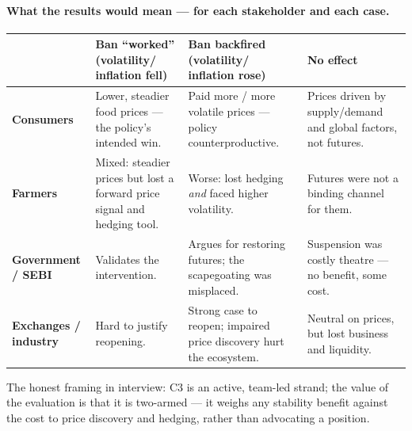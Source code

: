 \documentclass[11pt]{article}
\begin{document}
\paragraph{What the results would mean --- for each stakeholder and each case.}
\begin{center}
\small
\begin{tabular}{@{}p{2.4cm}p{3.5cm}p{3.5cm}p{3.5cm}@{}}
\toprule
 & \textbf{Ban ``worked''} (volatility/ inflation fell) & \textbf{Ban backfired} (volatility/ inflation rose) & \textbf{No effect} \\
\midrule
\textbf{Consumers} & Lower, steadier food prices --- the policy's intended win. & Paid more / more volatile prices --- policy counterproductive. & Prices driven by supply/demand and global factors, not futures. \\
\textbf{Farmers} & Mixed: steadier prices but lost a forward price signal and hedging tool. & Worse: lost hedging \emph{and} faced higher volatility. & Futures were not a binding channel for them. \\
\textbf{Government / SEBI} & Validates the intervention. & Argues for restoring futures; the scapegoating was misplaced. & Suspension was costly theatre --- no benefit, some cost. \\
\textbf{Exchanges / industry} & Hard to justify reopening. & Strong case to reopen; impaired price discovery hurt the ecosystem. & Neutral on prices, but lost business and liquidity. \\
\bottomrule
\end{tabular}
\end{center}
\noindent The honest framing in interview: C3 is an active, team-led strand; the value of
the evaluation is that it is two-armed --- it weighs any stability benefit against the cost
to price discovery and hedging, rather than advocating a position.
\end{document}
